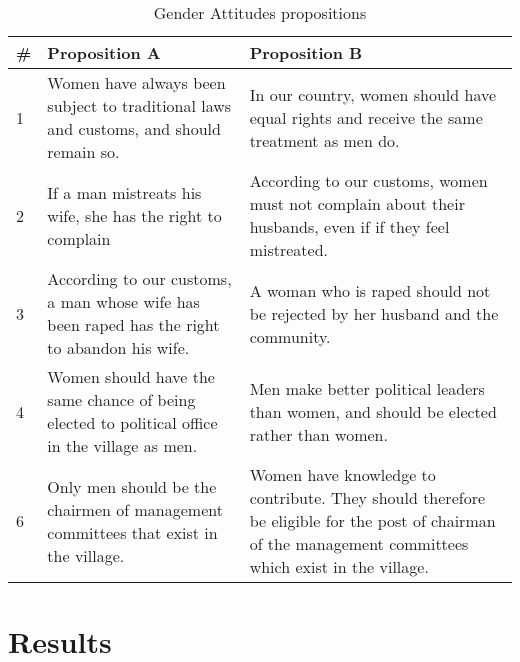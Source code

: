 \documentclass[10pt,a4paper]{scrartcl} %
\newcommand{\tableloc}{C:/Users/Koen/Dropbox/PhD/Papers/CongoGBV/Tables}
\begin{document}
\begin{table}[htb]
\centering
\caption{Gender Attitudes propositions}
\label{tab:genderatt}
\begin{tabularx}{\textwidth}{l X X}
\toprule
\# & Proposition A & Proposition B \\
\hline
1 & Women have always been subject to traditional laws and customs, and should remain so. &	In our country, women should have equal rights and receive the same treatment as men do. \\
2 & If a man mistreats his wife, she has the right to complain &	According to our customs, women must not complain about their husbands, even if if they feel mistreated. \\
3 & According to our customs, a man whose wife has been raped has the right to abandon his wife. &	A woman who is raped should not be rejected by her husband and the community. \\
4 & Women should have the same chance of being elected to political office in the village as men. & 	 Men make better political leaders  than women, and should be elected rather than women. \\
6 & Only men should be the chairmen of management committees that exist in the village. &	Women have knowledge to contribute. They should therefore be eligible for the post of chairman of the management committees which exist in the village. \\
\bottomrule
\end{tabularx}
\end{table}





\section*{Results}
\newcommand{\incid}[2]{\csvreader[filter strcmp={\key}{#1}]{\tableloc/incidence.csv}{key=\key,#2=\inc}{\inc}}
\end{document}
